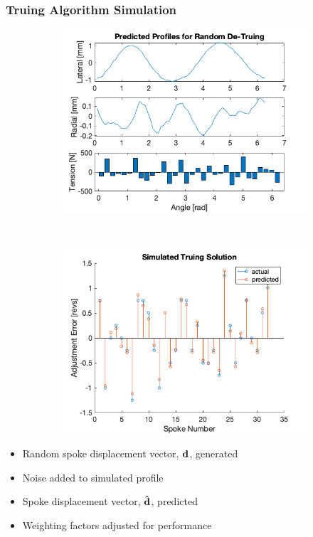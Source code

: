 \documentclass[mathserif]{beamer}
\begin{document}
\begin{frame}
\frametitle{Truing Algorithm Simulation}
\begin{figure}
        \centering
        \begin{subfigure}[b]{0.45\textwidth}
            \includegraphics[width=\textwidth]{detune}
        \end{subfigure}
        ~
        \begin{subfigure}[b]{0.45\textwidth}
            \includegraphics[width=\textwidth]{simtrue}
        \end{subfigure}
\end{figure}
\begin{itemize}
    \item Random spoke displacement vector, $\bf d$,  generated
    \item Noise added to simulated profile
    \item Spoke displacement vector, $\bf \hat d$, predicted
    \item Weighting factors adjusted for performance
\end{itemize}
\end{frame}
\end{document}
